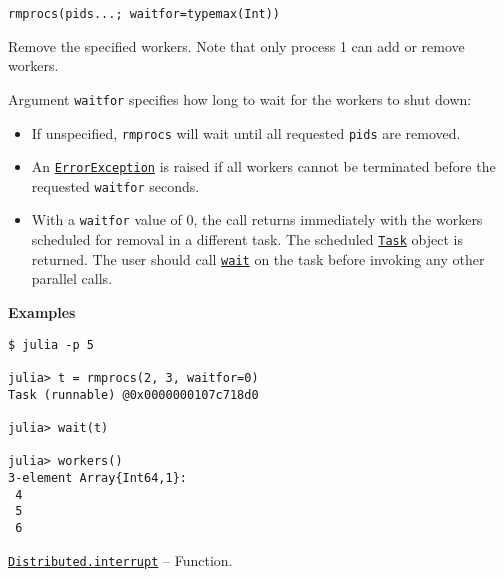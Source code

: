\begin{adjustwidth}{2em}{0pt}


\begin{verbatim}
rmprocs(pids...; waitfor=typemax(Int))
\end{verbatim}

Remove the specified workers. Note that only process 1 can add or remove workers.

Argument \texttt{waitfor} specifies how long to wait for the workers to shut down:

\begin{itemize}
\item If unspecified, \texttt{rmprocs} will wait until all requested \texttt{pids} are removed.


\item An \hyperlink{12102596058483452470}{\texttt{ErrorException}} is raised if all workers cannot be terminated before the requested \texttt{waitfor} seconds.


\item With a \texttt{waitfor} value of 0, the call returns immediately with the workers scheduled for removal in a different task. The scheduled \hyperlink{7131243650304654155}{\texttt{Task}} object is returned. The user should call \hyperlink{13761789780433862250}{\texttt{wait}} on the task before invoking any other parallel calls.

\end{itemize}
\textbf{Examples}


\begin{verbatim}
$ julia -p 5

julia> t = rmprocs(2, 3, waitfor=0)
Task (runnable) @0x0000000107c718d0

julia> wait(t)

julia> workers()
3-element Array{Int64,1}:
 4
 5
 6
\end{verbatim}



\end{adjustwidth}
\hypertarget{15554950403613599151}{}
\hyperlink{15554950403613599151}{\texttt{Distributed.interrupt}}  -- {Function.}

